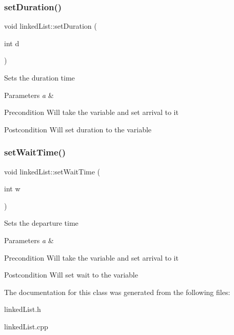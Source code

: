 \subsubsection{\texorpdfstring{set\+Duration()}{setDuration()}}
{\footnotesize\ttfamily void linked\+List\+::set\+Duration (\begin{DoxyParamCaption}\item[{int}]{d }\end{DoxyParamCaption})}

Sets the duration time 
\begin{DoxyParams}{Parameters}
{\em a} & \\
\hline
\end{DoxyParams}
\begin{DoxyPrecond}{Precondition}
Will take the variable and set arrival to it 
\end{DoxyPrecond}
\begin{DoxyPostcond}{Postcondition}
Will set duration to the variable 
\end{DoxyPostcond}
\mbox{\label{classlinked_list_a6f1132995025b714df0591209fb14af5}} 
\subsubsection{\texorpdfstring{set\+Wait\+Time()}{setWaitTime()}}
{\footnotesize\ttfamily void linked\+List\+::set\+Wait\+Time (\begin{DoxyParamCaption}\item[{int}]{w }\end{DoxyParamCaption})}

Sets the departure time 
\begin{DoxyParams}{Parameters}
{\em a} & \\
\hline
\end{DoxyParams}
\begin{DoxyPrecond}{Precondition}
Will take the variable and set arrival to it 
\end{DoxyPrecond}
\begin{DoxyPostcond}{Postcondition}
Will set wait to the variable 
\end{DoxyPostcond}


The documentation for this class was generated from the following files\+:\begin{DoxyCompactItemize}
\item 
linked\+List.\+h\item 
linked\+List.\+cpp\end{DoxyCompactItemize}
